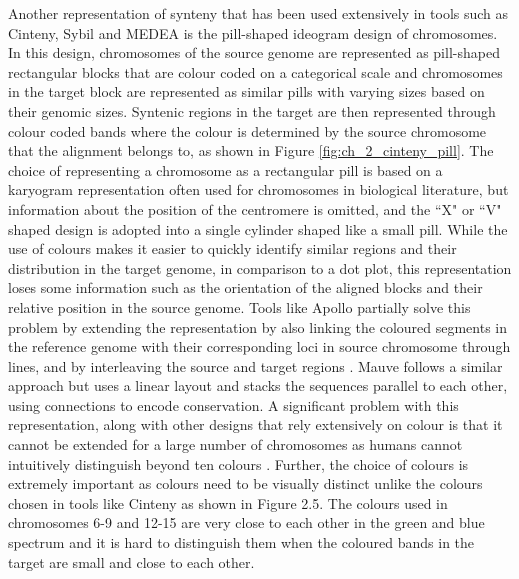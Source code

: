 Another representation of synteny that has been used extensively in tools such as Cinteny\cite{sinha2007cinteny}, Sybil\cite{crabtree2007sybil} and MEDEA\cite{nusrat2019tasks} is the pill-shaped ideogram design of chromosomes. In this design, chromosomes of the source genome are represented as pill-shaped rectangular blocks that are colour coded on a categorical scale and chromosomes in the target block are represented as similar pills with varying sizes based on their genomic sizes. Syntenic regions in the target are then represented through colour coded bands where the colour is determined by the source chromosome that the alignment belongs to, as shown in Figure \ref{fig:ch_2_cinteny_pill}.
The choice of representing a chromosome as a rectangular pill is based on a karyogram representation often used for chromosomes in biological literature\cite{pearson1973uniqueness}, but information about the position of the centromere is omitted, and the ``X" or ``V" shaped design is adopted into a single cylinder shaped like a small pill. While the use of colours makes it easier to quickly identify similar regions and their distribution in the target genome, in comparison to a dot plot, this representation loses some information such as the orientation of the aligned blocks and their relative position in the source genome. Tools like Apollo partially solve this problem by extending the representation by also linking the coloured segments in the reference genome with their corresponding loci in source chromosome through lines, and by interleaving the source and target regions \cite{lee2009apollo}. Mauve follows a similar approach but uses a linear layout and stacks the sequences parallel to each other, using connections to encode conservation\cite{darling2004mauve}. A significant problem with this representation, along with other designs that rely extensively on colour is that it cannot be extended for a large number of chromosomes as humans cannot intuitively distinguish beyond ten colours \cite{tufte1990envisioning}. Further, the choice of colours is extremely important as colours need to be visually distinct unlike the colours chosen in tools like Cinteny\cite{sinha2007cinteny} as shown in Figure 2.5. The colours used in chromosomes 6-9 and 12-15 are very close to each other in the green and blue spectrum and it is hard to distinguish them when the coloured bands in the target are small and close to each other. 

